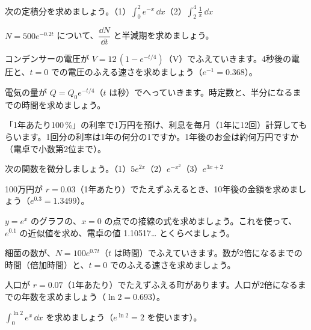 \bkproblem 次の定積分を求めましょう。\quad（1）$\displaystyle\int_0^2e^{-x}\,\dd x$\quad（2）$\displaystyle\int_2^4\frac{1}{x}\,\dd x$

\bkproblem $N=500e^{-0.2t}$ について、$\dfrac{\dd N}{\dd t}$ と半減期を求めましょう。

\bkproblem コンデンサーの電圧が $V=12\,(1-e^{-t/4})$（V）でふえていきます。4秒後の電圧と、$t=0$ での電圧のふえる速さを求めましょう（$e^{-1}=0.368$）。

\bkproblem 電気の量が $Q=Q_0e^{-t/4}$（$t$ は秒）でへっていきます。時定数と、半分になるまでの時間を求めましょう。

\bkproblem 「1年あたり100\,\%」の利率で1万円を預け、利息を毎月（1年に12回）計算してもらいます。1回分の利率は1年の何分の1ですか。1年後のお金は約何万円ですか（電卓で小数第2位まで）。

\bkproblem 次の関数を微分しましょう。\quad（1）$5e^{2x}$\quad（2）$e^{-x^2}$\quad（3）$e^{3x+2}$

\bkproblem 100万円が $r=0.03$（1年あたり）でたえずふえるとき、10年後の金額を求めましょう（$e^{0.3}=1.3499$）。


\bkproblem $y=e^x$ のグラフの、$x=0$ の点での接線の式を求めましょう。これを使って、$e^{0.1}$ の近似値を求め、電卓の値 1.10517… とくらべましょう。

\bkproblem 細菌の数が、$N=100e^{0.7t}$（$t$ は時間）でふえていきます。数が2倍になるまでの時間（倍加時間）と、$t=0$ でのふえる速さを求めましょう。

\bkproblem 人口が $r=0.07$（1年あたり）でたえずふえる町があります。人口が2倍になるまでの年数を求めましょう（$\ln2=0.693$）。

\bkproblem $\displaystyle\int_0^{\ln2}e^x\,\dd x$ を求めましょう（$e^{\ln2}=2$ を使います）。

